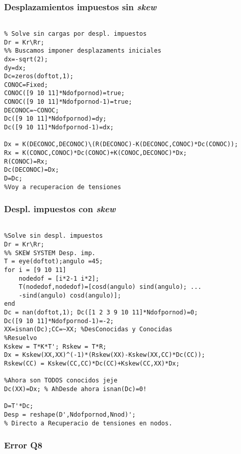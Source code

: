 \subsubsection*{Desplazamientos impuestos sin \emph{skew}}
\begin{code}
\begin{verbatim}

% Solve sin cargas por despl. impuestos
Dr = Kr\Rr;
%% Buscamos imponer desplazaments iniciales
dx=-sqrt(2);
dy=dx;
Dc=zeros(doftot,1);
CONOC=Fixed;
CONOC([9 10 11]*Ndofpornod)=true;
CONOC([9 10 11]*Ndofpornod-1)=true;
DECONOC=~CONOC;
Dc([9 10 11]*Ndofpornod)=dy;
Dc([9 10 11]*Ndofpornod-1)=dx;

Dx = K(DECONOC,DECONOC)\(R(DECONOC)-K(DECONOC,CONOC)*Dc(CONOC));
Rx = K(CONOC,CONOC)*Dc(CONOC)+K(CONOC,DECONOC)*Dx;
R(CONOC)=Rx;
Dc(DECONOC)=Dx;
D=Dc;
%Voy a recuperacion de tensiones
\end{verbatim}
\end{code}
\subsubsection*{Despl. impuestos con \emph{skew}}
\begin{code}
\begin{verbatim}

%Solve sin despl. impuestos
Dr = Kr\Rr;
%% SKEW SYSTEM Desp. imp.
T = eye(doftot);angulo =45;
for i = [9 10 11]
    nodedof = [i*2-1 i*2];
    T(nodedof,nodedof)=[cosd(angulo) sind(angulo); ...
    -sind(angulo) cosd(angulo)];
end
Dc = nan(doftot,1); Dc([1 2 3 9 10 11]*Ndofpornod)=0;
Dc([9 10 11]*Ndofpornod-1)=-2;
XX=isnan(Dc);CC=~XX; %DesConocidas y Conocidas
%Resuelvo
Kskew = T*K*T'; Rskew = T*R;
Dx = Kskew(XX,XX)^(-1)*(Rskew(XX)-Kskew(XX,CC)*Dc(CC));
Rskew(CC) = Kskew(CC,CC)*Dc(CC)+Kskew(CC,XX)*Dx;

%Ahora son TODOS conocidos jeje
Dc(XX)=Dx; % AhDesde ahora isnan(Dc)=0!

D=T'*Dc;
Desp = reshape(D',Ndofpornod,Nnod)';
% Directo a Recuperacio de tensiones en nodos.
\end{verbatim}
\end{code}

\subsubsection*{Error Q8}

